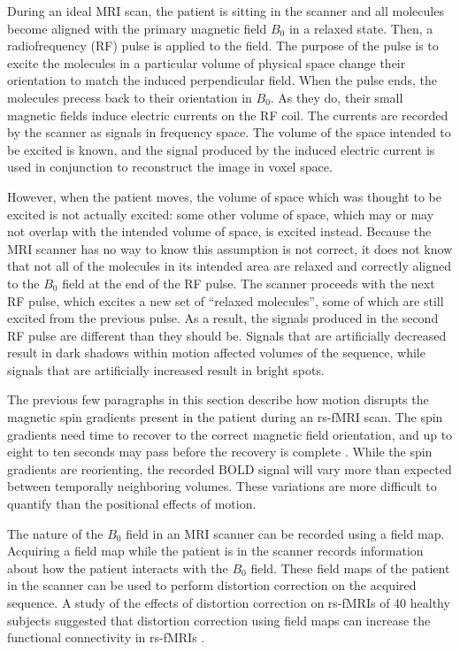 During an ideal MRI scan, the patient is sitting in the scanner and all molecules become aligned with the primary magnetic field $B_0$ in a relaxed state. Then, a radiofrequency (RF) pulse is applied to the field. The purpose of the pulse is to excite the molecules in a particular volume of physical space change their orientation to match the induced perpendicular field. When the pulse ends, the molecules precess back to their orientation in $B_0$. As they do, their small magnetic fields induce electric currents on the RF coil. The currents are recorded by the scanner as signals in frequency space. The volume of the space intended to be excited is known, and the signal produced by the induced electric current is used in conjunction to reconstruct the image in voxel space.

However, when the patient moves, the volume of space which was thought to be excited is not actually excited: some other volume of space, which may or may not overlap with the intended volume of space, is excited instead. Because the MRI scanner has no way to know this assumption is not correct, it does not know that not all of the molecules in its intended area are relaxed and correctly aligned to the $B_0$ field at the end of the RF pulse. The scanner proceeds with the next RF pulse, which excites a new set of ``relaxed molecules'', some of which are still excited from the previous pulse. As a result, the signals produced in the second RF pulse are different than they should be. Signals that are artificially decreased result in dark shadows within motion affected volumes of the sequence, while signals that are artificially increased result in bright spots.

The previous few paragraphs in this section describe how motion disrupts the magnetic spin gradients present in the patient during an rs-fMRI scan. The spin gradients need time to recover to the correct magnetic field orientation, and up to eight to ten seconds may pass before the recovery is complete \cite{Power2014}. While the spin gradients are reorienting, the recorded BOLD signal will vary more than expected between temporally neighboring volumes. These variations are more difficult to quantify than the positional effects of motion.

The nature of the $B_0$ field in an MRI scanner can be recorded using a field map. Acquiring a field map while the patient is in the scanner records information about how the patient interacts with the $B_0$ field. These field maps of the patient in the scanner can be used to perform distortion correction on the acquired sequence. A study of the effects of distortion correction on rs-fMRIs of 40 healthy subjects suggested that distortion correction using field maps can increase the functional connectivity in rs-fMRIs \cite{Togo2017}.

